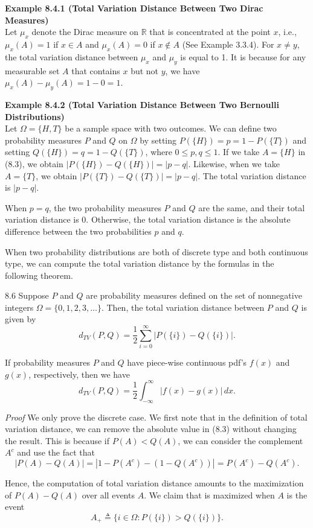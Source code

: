 \textbf{Example 8.4.1 (Total Variation Distance Between Two Dirac Measures)} \\
Let $\mu_x$ denote the Dirac measure on $\mathbb{R}$ that is concentrated at the point $x$, i.e., $\mu_x(A)=1$ if $x\in A$ and $\mu_x(A)=0$ if $x\notin A$ (See Example 3.3.4). For $x\neq y$, the total variation distance between $\mu_x$ and $\mu_y$ is equal to 1. It is because for any measurable set $A$ that contains $x$ but not $y$, we have $\mu_x(A)-\mu_y(A)=1-0=1$.

\textbf{Example 8.4.2 (Total Variation Distance Between Two Bernoulli Distributions)} \\
Let $\Omega=\{H,T\}$ be a sample space with two outcomes. We can define two probability measures $P$ and $Q$ on $\Omega$ by setting $P(\{H\})=p=1-P(\{T\})$ and setting $Q(\{H\})=q=1-Q(\{T\})$, where $0\le p,q\le 1$. If we take $A=\{H\}$ in (8.3), we obtain $|P(\{H\})-Q(\{H\})|=|p-q|$. Likewise, when we take $A=\{T\}$, we obtain $|P(\{T\})-Q(\{T\})|=|p-q|$. The total variation distance is $|p-q|$.

When $p=q$, the two probability measures $P$ and $Q$ are the same, and their total variation distance is 0. Otherwise, the total variation distance is the absolute difference between the two probabilities $p$ and $q$.

When two probability distributions are both of discrete type and both continuous type, we can compute the total variation distance by the formulas in the following theorem.

\begin{thmbox}{8.6}
Suppose $P$ and $Q$ are probability measures defined on the set of nonnegative integers $\Omega=\{0,1,2,3,\dots\}$. Then, the total variation distance between $P$ and $Q$ is given by
\[
d_{TV}(P,Q)=\frac{1}{2}\sum_{i=0}^{\infty} |P(\{i\})-Q(\{i\})|.
\]

If probability measures $P$ and $Q$ have piece-wise continuous pdf's $f(x)$ and $g(x)$, respectively, then we have
\[
d_{TV}(P,Q)=\frac{1}{2}\int_{-\infty}^{\infty} |f(x)-g(x)|\, dx.
\]
\end{thmbox}

\textit{Proof} We only prove the discrete case. We first note that in the definition of total variation distance, we can remove the absolute value in (8.3) without changing the result. This is because if $P(A)<Q(A)$, we can consider the complement $A^c$ and use the fact that
\[
|P(A)-Q(A)| = |1-P(A^c)-(1-Q(A^c))| = P(A^c)-Q(A^c).
\]

Hence, the computation of total variation distance amounts to the maximization of $P(A)-Q(A)$ over all events $A$. We claim that is maximized when $A$ is the event
\[
A_+\triangleq \{i\in \Omega : P(\{i\})>Q(\{i\})\}.
\]

